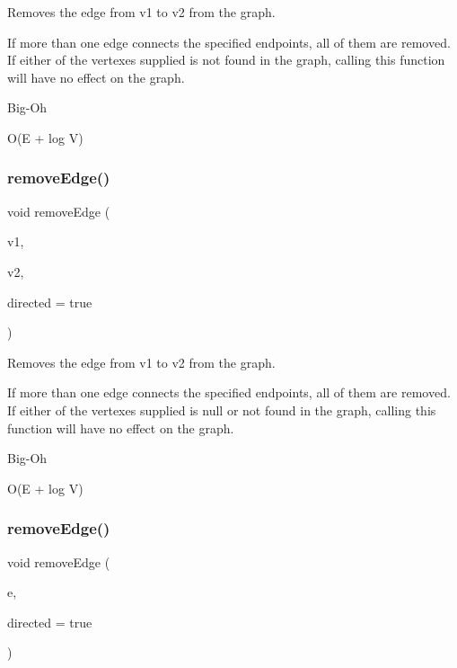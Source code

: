 Removes the edge from v1 to v2 from the graph. 

If more than one edge connects the specified endpoints, all of them are removed. If either of the vertexes supplied is not found in the graph, calling this function will have no effect on the graph. \begin{DoxyRefDesc}{Big-\/\+Oh}
\item[\mbox{\hyperlink{BigOh__BigOh000029}{Big-\/\+Oh}}]O(E + log V) \end{DoxyRefDesc}
\mbox{\label{classBasicGraphGen_a8b1003fbe63fab20173526459fff4139}} 
\subsubsection{\texorpdfstring{remove\+Edge()}{removeEdge()}\hspace{0.1cm}{\footnotesize\ttfamily [2/3]}}
{\footnotesize\ttfamily void remove\+Edge (\begin{DoxyParamCaption}\item[{\mbox{\hyperlink{classVertexGen}{Vertex\+Gen}}$<$ V, E $>$ $\ast$}]{v1,  }\item[{\mbox{\hyperlink{classVertexGen}{Vertex\+Gen}}$<$ V, E $>$ $\ast$}]{v2,  }\item[{bool}]{directed = {\ttfamily true} }\end{DoxyParamCaption})}



Removes the edge from v1 to v2 from the graph. 

If more than one edge connects the specified endpoints, all of them are removed. If either of the vertexes supplied is null or not found in the graph, calling this function will have no effect on the graph. \begin{DoxyRefDesc}{Big-\/\+Oh}
\item[\mbox{\hyperlink{BigOh__BigOh000030}{Big-\/\+Oh}}]O(E + log V) \end{DoxyRefDesc}
\mbox{\label{classBasicGraphGen_a2c6bb1e8e2c18b7376504692f7baae62}} 
\subsubsection{\texorpdfstring{remove\+Edge()}{removeEdge()}\hspace{0.1cm}{\footnotesize\ttfamily [3/3]}}
{\footnotesize\ttfamily void remove\+Edge (\begin{DoxyParamCaption}\item[{Edge\+Gen$<$ V, E $>$ $\ast$}]{e,  }\item[{bool}]{directed = {\ttfamily true} }\end{DoxyParamCaption})}



